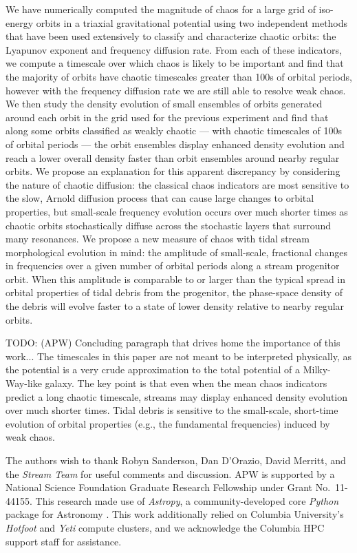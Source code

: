 \documentclass[letterpaper,12pt,preprint]{aastex}
\newcommand{\project}[1]{\textsl{#1}}
\newcommand{\todo}[2]{{\color{red} TODO: (\MakeUppercase{#1}) #2}}
\begin{document}
We have numerically computed the magnitude of chaos for a large grid of iso-energy orbits in a triaxial gravitational potential using two independent methods that have been used extensively to classify and characterize chaotic orbits: the Lyapunov exponent and frequency diffusion rate. From each of these indicators, we compute a timescale over which chaos is likely to be important and find that the majority of orbits have chaotic timescales greater than 100s of orbital periods, however with the frequency diffusion rate we are still able to resolve weak chaos. We then study the density evolution of small ensembles of orbits generated around each orbit in the grid used for the previous experiment and find that along some orbits classified as weakly chaotic --- with chaotic timescales of 100s of orbital periods --- the orbit ensembles display enhanced density evolution and reach a lower overall density faster than orbit ensembles around nearby regular orbits. We propose an explanation for this apparent discrepancy by considering the nature of chaotic diffusion: the classical chaos indicators are most sensitive to the  slow, Arnold diffusion process that can cause large changes to orbital properties, but small-scale frequency evolution occurs over much shorter times as chaotic orbits stochastically diffuse across the stochastic layers that surround many resonances. We propose a new measure of chaos with tidal stream morphological evolution in mind: the amplitude of small-scale, fractional changes in frequencies over a given number of orbital periods along a stream progenitor orbit. When this amplitude is comparable to or larger than the typical spread in orbital properties of tidal debris from the progenitor, the phase-space density of the debris will evolve faster to a state of lower density relative to nearby regular orbits.

\todo{apw}{Concluding paragraph that drives home the importance of this work...}
The timescales in this paper are not meant to be interpreted physically, as the potential is a very crude approximation to the total potential of a Milky-Way-like galaxy. The key point is that even when the mean chaos indicators predict a long chaotic timescale, streams may display enhanced density evolution over much shorter times. Tidal debris is sensitive to the small-scale, short-time evolution of orbital properties (e.g., the fundamental frequencies) induced by weak chaos.

\acknowledgements
The authors wish to thank Robyn Sanderson, Dan D'Orazio, David Merritt, and the \emph{Stream Team} for useful comments and discussion. APW is supported by a National Science Foundation Graduate Research Fellowship under Grant No.\ 11-44155. This research made use of \project{Astropy}, a community-developed core \project{Python} package for Astronomy \citep{astropy13}. This work additionally relied on Columbia University's \emph{Hotfoot} and \emph{Yeti} compute clusters, and we acknowledge the Columbia HPC support staff for assistance.
\end{document}
